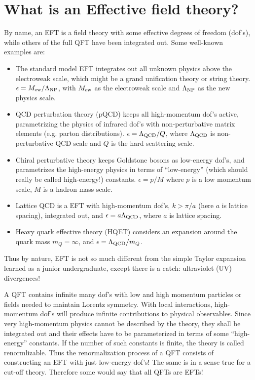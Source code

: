 \documentclass[prd,aps,twocolumn,preprintnumbers,showpacs,nofootinbib,superscriptaddress,notitlepage]{revtex4-1}
\begin{document}
\section{What is an Effective field theory?}

By name, an EFT is a field theory with some effective degrees
of freedom (dof's), while others of the full QFT have been
integrated out. Some well-known examples are:
\begin{itemize}
\item{The standard model EFT integrates out all unknown physics
above the electroweak scale, which might be a grand unification theory
or string theory. $\epsilon=M_{\rm ew}/\Lambda_{\rm NP}$,
with $M_{\rm ew}$ as the electroweak scale and $\Lambda_{\rm NP}$ as the new physics scale.}
\item{
QCD perturbation theory (pQCD) keeps
all high-momentum dof's active, parametrizing the
physics of infrared dof's with non-perturbative
matrix elements (e.g. parton distributions). $\epsilon= \Lambda_{\rm QCD}/Q$,
where $\Lambda_{\rm QCD}$ is non-perturbative QCD scale and $Q$ is the hard scattering scale.}
\item{Chiral perturbative theory
keeps Goldstone bosons as low-energy dof's, and parametrizes the
high-energy physics in terms of ``low-energy'' (which should really be called high-energy!)
constants. $\epsilon=p/M$ where $p$ is a low momentum scale, $M$ is a hadron mass scale. }
\item{Lattice QCD is a EFT with
high-momentum dof's, $k>\pi/a$ (here $a$ is lattice spacing), integrated
out, and $\epsilon= a\Lambda_{\rm QCD}$, where $a$ is lattice spacing.}
\item{Heavy quark effective theory (HQET) considers an expansion around the quark mass $m_Q=\infty$, and
$\epsilon=\Lambda_{\rm QCD}/m_Q$. }
\end{itemize}
Thus by nature, EFT is not
so much different from the simple Taylor expansion learned
as a junior undergraduate, except there is a catch:
ultraviolet (UV) divergences!

A QFT contains infinite many dof's with low and
high momentum particles or fields needed to maintain Lorentz symmetry.
With local interactions, high-momentum dof's will produce infinite contributions to
physical observables. Since very high-momentum physics
cannot be described by the theory, they shall be integrated out and
their effects have to be parameterized in terms of some ``high-energy'' constants.
If the number of such constants is finite, the theory
is called renormlizable. Thus the renormalization
process of a QFT consists of constructing an EFT
with just low-energy dof's!
The same is in a sense true for a cut-off theory.
Therefore some would say that all QFTs are EFTs!
\end{document}
